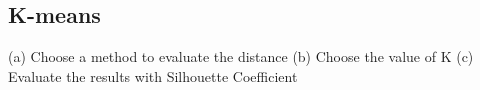 
\subsection{K-means}

(a) Choose a method to evaluate the distance
(b) Choose the value of K
(c) Evaluate the results with Silhouette Coefficient